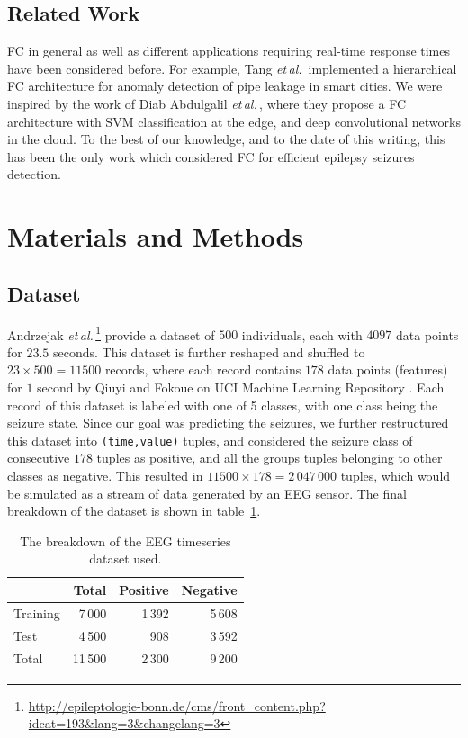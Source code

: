 \documentclass[letterpaper]{article}
\newcommand{\etal}{\emph{et\,al.}\,}
\begin{document}
\subsection{Related Work}
FC in general as well as different applications requiring real-time response times have been considered before. For example, Tang \etal\cite{Tang:2015} implemented a hierarchical FC architecture for anomaly detection of pipe leakage in smart cities. We were inspired by the work of Diab Abdulgalil \etal\cite{DiabAbdulgalil2018}, where they propose a FC architecture with SVM classification at the edge, and deep convolutional networks in the cloud. To the best of our knowledge, and to the date of this writing, this has been the only work which considered FC for efficient epilepsy seizures detection.


 \section{Materials and Methods}\label{materials}

 \subsection{Dataset}
 Andrzejak \etal\cite{PhysRevE.64.061907}\footnote{\url{http://epileptologie-bonn.de/cms/front_content.php?idcat=193&lang=3&changelang=3}} provide a dataset of \(500\) individuals, each with \(4097\) data points for \(23.5\) seconds. This dataset is further reshaped and shuffled to \(23 \times 500 = 11500\) records, where each record contains \(178\) data points (features) for \(1\) second by Qiuyi and Fokoue on UCI Machine Learning Repository \cite{UCIDataset}. Each record of this dataset is labeled with one of 5 classes, with one class being the seizure state. Since our goal was predicting the seizures, we further restructured this dataset into \texttt{(time,value)} tuples, and considered the seizure class of consecutive \(178\) tuples as positive, and all the groups tuples belonging to other classes as negative. This resulted in \(11500 \times 178 = 2\,047\,000\) tuples, which would be simulated as a stream of data generated by an EEG sensor. The final breakdown of the dataset is shown in table~\ref{tab.dataset}.

\begin{table}
  \centering
  \caption{The breakdown of the EEG timeseries dataset used.}
  \label{tab.dataset}
  {\begin{tabular}{@{} lrrr @{}}
    \toprule
      & Total & Positive & Negative\\
    \midrule
    Training & 7\,000 & 1\,392 & 5\,608\\
    Test & 4\,500& 908 & 3\,592\\
    \addlinespace
    Total & 11\,500 & 2\,300 & 9\,200\\
    \bottomrule
  \end{tabular}}
\end{table}
\end{document}
